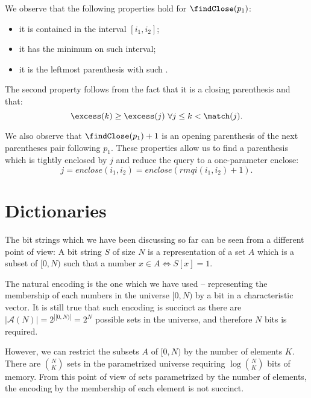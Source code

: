 We observe that the following properties hold for $\findClose(p_1)$:
\begin{itemize}
	\item it is contained in the interval $[i_1, i_2]$;
	\item it has the minimum \excess{} on such interval;
	\item it is the leftmost parenthesis with such \excess{}.
\end{itemize}
The second property follows from the fact that it is a closing parenthesis and that:
$$ \excess(k) \ge \excess(j) \ \forall j \le k < \match(j). $$

We also observe that $\findClose(p_1) + 1$ is an opening parenthesis of the next parentheses pair following $p_1$.
These properties allow us to find a parenthesis which is tightly enclosed by $j$ and reduce the query to a one-parameter enclose:
$$ j = enclose(i_1, i_2) = enclose(rmqi(i_1, i_2) + 1). $$

\section{Dictionaries}

The bit strings which we have been discussing so far can be seen from a different point of view:
A bit string $S$ of size $N$ is a representation of a set $A$ which is a subset of $[0, N)$ such that a number $x \in A \iff S[x] = 1$.

The natural encoding is the one which we have used -- representing the membership of each numbers in the universe $[0, N)$ by a bit in a characteristic vector.
It is still true that such encoding is succinct as there are $| \mathcal{A}(N) | = 2^{|[0, N)|} = 2^N$ possible sets in the universe, and therefore $N$ bits is required.

However, we can restrict the subsets $A$ of $[0, N)$ by the number of elements $K$.
There are ${N \choose K}$ sets in the parametrized universe requiring $\log {N \choose K}$ bits of memory.
From this point of view of sets parametrized by the number of elements, the encoding by the membership of each element is not succinct.

\bigbreak

